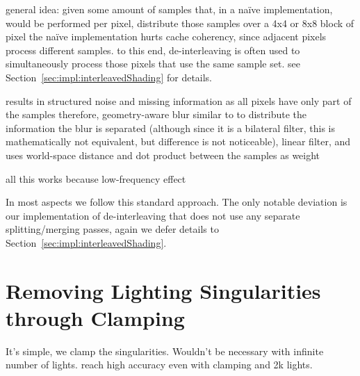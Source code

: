 \begin{outline}
\1 general idea: given some amount of samples that, in a naïve implementation, would be performed per pixel, distribute those samples over a 4x4 or 8x8 block of pixel
\1 the naïve implementation hurts cache coherency, since adjacent pixels process different samples.
\1 to this end, de-interleaving \citep{segovia2006non} is often used to simultaneously process those pixels that use the same sample set. see Section~\ref{sec:impl:interleavedShading} for details.

\1 results in structured noise and missing information as all pixels have only part of the samples
\1 therefore, geometry-aware blur similar to \citet{laine2007incremental} to distribute the information
\1 the blur is separated (although since it is a bilateral filter, this is mathematically not equivalent, but difference is not noticeable), linear filter, and uses world-space distance and dot product between the samples as weight

\1 all this works because low-frequency effect

\1 In most aspects we follow this standard approach. The only notable deviation is our implementation of de-interleaving that does not use any separate splitting/merging passes, again we defer details to Section~\ref{sec:impl:interleavedShading}.

\end{outline}



\section{Removing Lighting Singularities through Clamping}
\label{sec:concept:clamping}
It's simple, we clamp the singularities. Wouldn't be necessary with infinite number of lights. \citet{hedman2016sequential} reach high accuracy even with clamping and 2k lights.
